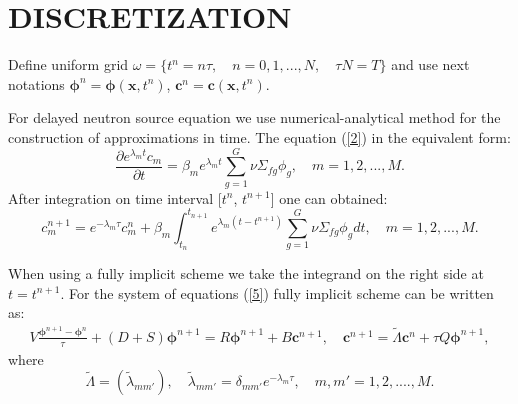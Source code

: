 \documentclass{aip-cp}
\begin{document}

\section{DISCRETIZATION}
Define uniform grid
$\omega = \{ t^n=n \tau, \quad n = 0,1,...,N, \quad \tau N = T \}$ and use next notations $\bm\phi^n = \bm\phi(\bm{x}, t^n)$, $\bm c^n = \bm c(\bm{x}, t^n)$.

For delayed neutron source equation we use numerical-analytical method for the construction of approximations in time.
The equation (\ref{2}) in the equivalent form:
\[
  \frac{\partial e^{\lambda_m t}  c_m}{\partial t} = \beta_m  e^{\lambda_m t} \sum_{g=1}^{G} \nu \Sigma_{fg} \phi_g,
 \quad m = 1,2, ..., M .
\] 
After integration on time interval [$t^{n}$, $t^{n+1}$] one can obtained:
\begin{equation}\label{8}
c_m^{n+1} = e^{-\lambda_m\tau} c_m^n + \beta_m \int_{t_n}^{t_{n+1}}e^{\lambda_m (t-t^{n+1})} \sum_{g=1}^{G} \nu \Sigma_{fg} \phi_g d t,
 \quad m = 1,2, ..., M.
\end{equation}

When using a fully implicit scheme we take the integrand on the right side at $t = t^{n+1}$. For the system of equations (\ref{5}) fully implicit scheme can be written as:
\begin{eqnarray*}
V \frac{\bm\phi^{n+1}-\bm\phi^n}{\tau}+(D+S) 
\bm \phi^{n+1} = R \bm \phi^{n+1} + B\bm c^{n+1},
\quad
\bm{c}^{n+1} = \widetilde{\Lambda}\bm{c}^{n} + \tau Q \bm{\phi}^{n+1},
\end{eqnarray*}
where
\[
\widetilde{\Lambda} = (\widetilde{\lambda}_{mm'}), \quad \widetilde{\lambda}_{mm'} = \delta_{mm'} e^{-\lambda_m\tau},
 \quad m, m' = 1,2, ....,M .
\]
\end{document}
